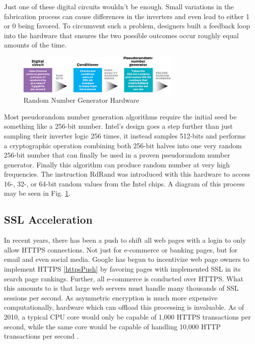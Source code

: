 \documentclass[journal]{IEEEtran}
\begin{document}
Just one of these digital circuits wouldn't be enough.  Small variations in the fabrication process can cause differences in the inverters and even lead to either 1 or 0 being favored.  To circumvent such a problem, designers built a feedback loop into the hardware that ensures the two possible outcomes occur roughly equal amounts of the time.


\begin{figure}[htbp]
	\centering
	\includegraphics[width=8cm,keepaspectratio]{img/rngProcess.png}
	\caption{Random Number Generator Hardware \cite{IEEERNG} }
	\label{rngFig}
\end{figure}



Most pseudorandom number generation algorithms require the initial seed be something like a 256-bit number.  Intel's design goes a step further than just sampling their inverter logic 256 times, it instead samples 512-bits and performs a cryptographic operation combining both 256-bit halves into one very random 256-bit number that can finally be used in a proven pseudorandom number generator.  Finally this algorithm can produce random number at very high frequencies.  The instruction RdRand was introduced with this hardware to access 16-, 32-, or 64-bit random values from the Intel chips.  A diagram of this process may be seen in Fig. \ref{rngFig}.

\subsection{SSL Acceleration}

In recent years, there has been a push to shift all web pages with a login to only allow HTTPS connections.  Not just for e-commerce or banking pages, but for email and even social media.  Google has begun to incentivize web page owners to implement HTTPS \ref{httpsPush} by favoring pages with implemented SSL in its search page rankings.  Further, all e-commerce is conducted over HTTPS.  What this amounts to is that large web servers must handle many thousands of SSL sessions per second.  As asymmetric encryption is much more expensive computationally, hardware which can offload this processing is invaluable.  As of 2010, a typical CPU core would only be capable of 1,000 HTTPS transactions per second, while the same core would be capable of handling 10,000 HTTP transactions per second \cite{sslGPU}.
\end{document}
